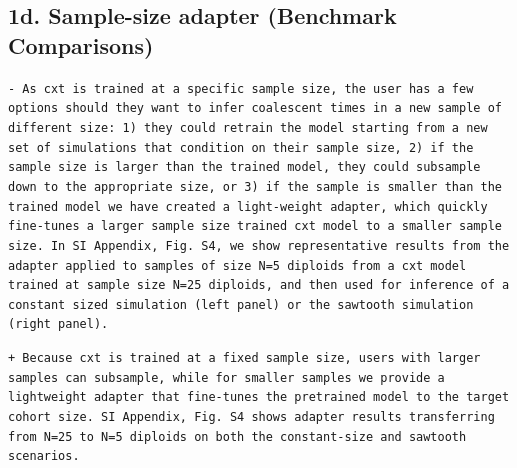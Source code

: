 \documentclass[10pt]{article}
\newcommand{\rem}[1]{\par\noindent\colorbox{rembg}{\parbox{\dimexpr\linewidth-2\fboxsep}{\small\textcolor{remtext}{\texttt{-\ #1}}}}}
\newcommand{\add}[1]{\par\noindent\colorbox{addbg}{\parbox{\dimexpr\linewidth-2\fboxsep}{\small\textcolor{addtext}{\texttt{+\ #1}}}}}
\begin{document}
\subsection*{\small 1d. Sample-size adapter (Benchmark Comparisons)}
\begin{mdframed}[style=diffbox]
\rem{As cxt is trained at a specific sample size, the user has a few options should they want to infer coalescent times in a new sample of different size: 1) they could retrain the model starting from a new set of simulations that condition on their sample size, 2) if the sample size is larger than the trained model, they could subsample down to the appropriate size, or 3) if the sample is smaller than the trained model we have created a light-weight adapter, which quickly fine-tunes a larger sample size trained cxt model to a smaller sample size. In SI Appendix, Fig. S4, we show representative results from the adapter applied to samples of size N=5 diploids from a cxt model trained at sample size N=25 diploids, and then used for inference of a constant sized simulation (left panel) or the sawtooth simulation (right panel).}
\add{Because cxt is trained at a fixed sample size, users with larger samples can subsample, while for smaller samples we provide a lightweight adapter that fine-tunes the pretrained model to the target cohort size. SI Appendix, Fig. S4 shows adapter results transferring from N=25 to N=5 diploids on both the constant-size and sawtooth scenarios.}
\end{mdframed}
\end{document}
